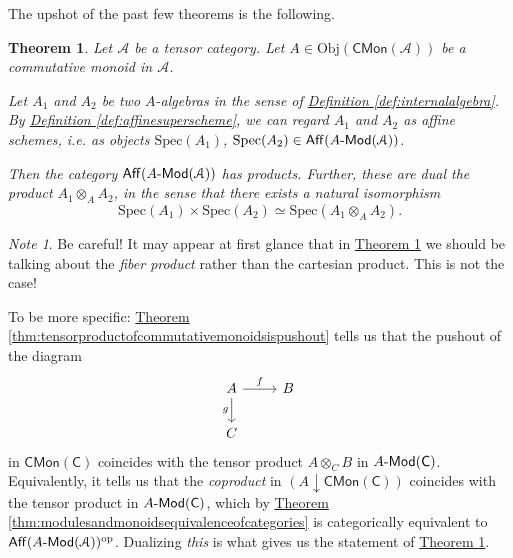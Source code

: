 \documentclass[a4paper,10pt]{scrreprt}
\newcommand{\Obj}{\mathrm{Obj}}
\newcommand{\Spec}{\mathrm{Spec}}
\def\mhyp{{\hbox{-}}}
\theoremstyle{definition}
\theoremstyle{plain}
\newtheorem{theorem}{Theorem}[section]
\theoremstyle{remark}
\newtheorem{note}{Note}[section]
\begin{document}
The upshot of the past few theorems is the following.
\begin{theorem}
  \label{thm:quasiffinevarietieshaveproducts}
  Let $\mathcal{A}$ be a tensor category. Let $A \in \Obj(\mathsf{CMon}(\mathcal{A}))$ be a commutative monoid in $\mathcal{A}$.

  Let $A_{1}$ and $A_{2}$ be two $A$-algebras in the sense of \hyperref[def:internalalgebra]{Definition \ref*{def:internalalgebra}}. By \hyperref[def:affinesuperscheme]{Definition \ref*{def:affinesuperscheme}}, we can regard $A_{1}$ and $A_{2}$ as affine schemes, i.e. as objects $\Spec(A_{1})$, $\Spec(A_{2}) \in \mathsf{Aff}(A\mhyp\mathsf{Mod}(\mathcal{A}))$.

  Then the category $\mathsf{Aff}(A\mhyp\mathsf{Mod}(\mathcal{A}))$ has products. Further, these are dual the product $A_{1} \otimes_{A} A_{2}$, in the sense that there exists a natural isomorphism
  \begin{equation*}
    \Spec(A_{1}) \times \Spec(A_{2}) \simeq \Spec(A_{1} \otimes_{A} A_{2}).
  \end{equation*}
\end{theorem} 

\begin{note}
  Be careful! It may appear at first glance that in \hyperref[thm:quasiffinevarietieshaveproducts]{Theorem \ref*{thm:quasiffinevarietieshaveproducts}} we should be talking about the \emph{fiber product} rather than the cartesian product. This is not the case! 

  To be more specific: \hyperref[thm:tensorproductofcommutativemonoidsispushout]{Theorem \ref*{thm:tensorproductofcommutativemonoidsispushout}} tells us that the pushout of the diagram 
  \begin{equation*}
    \begin{tikzcd}
      A
      \arrow[r, "f"]
      \arrow[d, swap, "g"]
      & B
      \\
      C
    \end{tikzcd}
  \end{equation*}
  in $\mathsf{CMon}(\mathsf{C})$ coincides with the tensor product $A \otimes_{C} B$ in $A\mhyp\mathsf{Mod}(\mathsf{C})$. Equivalently, it tells us that the \emph{coproduct} in $(A \downarrow\mathsf{CMon}(\mathsf{C}))$ coincides with the tensor product in $A\mhyp\mathsf{Mod}(\mathsf{C})$, which by \hyperref[thm:modulesandmonoidsequivalenceofcategories]{Theorem \ref*{thm:modulesandmonoidsequivalenceofcategories}} is categorically equivalent to $\mathsf{Aff}(A\mhyp\mathsf{Mod}(\mathcal{A}))^{\mathrm{op}}$. Dualizing \emph{this} is what gives us the statement of \hyperref[thm:quasiffinevarietieshaveproducts]{Theorem \ref*{thm:quasiffinevarietieshaveproducts}}.
\end{note}
\end{document}
